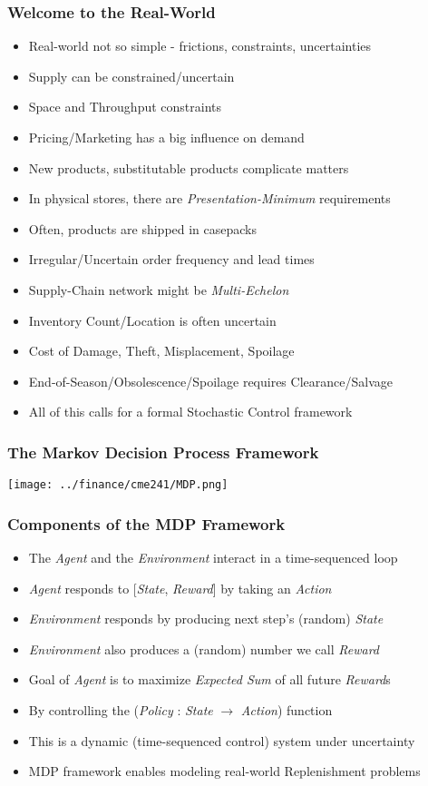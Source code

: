 \documentclass[handout]{beamer}
\begin{document}
\begin{frame}
\frametitle{Welcome to the Real-World}
\pause
\begin{itemize}[<+->]
\item Real-world not so simple - frictions, constraints, uncertainties
\item Supply can be constrained/uncertain
\item Space and Throughput constraints
\item Pricing/Marketing has a big influence on demand
\item New products, substitutable products complicate matters
\item In physical stores, there are {\em Presentation-Minimum} requirements
\item Often, products are shipped in casepacks
\item Irregular/Uncertain order frequency and lead times
\item Supply-Chain network might be {\em Multi-Echelon}
\item Inventory Count/Location is often uncertain
\item Cost of Damage, Theft, Misplacement, Spoilage
\item End-of-Season/Obsolescence/Spoilage requires Clearance/Salvage
\item All of this calls for a formal Stochastic Control framework
\end{itemize}
\end{frame}


\begin{frame}
\frametitle{The Markov Decision Process Framework}
\texttt{[image: ../finance/cme241/MDP.png]}
\end{frame}

\begin{frame}
\frametitle{Components of the MDP Framework}
\pause
\begin{itemize}[<+->]
\item The {\em Agent} and the {\em Environment} interact in a time-sequenced loop
\item {\em Agent} responds to [{\em State}, {\em Reward}] by taking an {\em Action}
\item {\em Environment} responds by producing next step's (random) {\em State}
\item {\em Environment} also produces a (random) number we call {\em Reward}
\item Goal of {\em Agent} is to maximize {\em Expected Sum} of all future {\em Reward}s
\item By controlling the ({\em Policy} : {\em State} $\rightarrow$ {\em Action}) function
\item This is a dynamic (time-sequenced control) system under uncertainty
\item MDP framework enables modeling real-world Replenishment problems
\end{itemize}
\end{frame}
\end{document}
